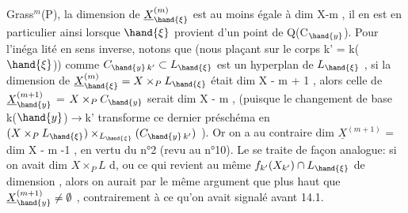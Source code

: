 
Grass$^{m}$(P), la dimension de $\underline{X}^{(m)}_{\hand{\xi}}$ est au moins égale à dim X-m , il en est
en particulier ainsi lorsque $\hand{\xi}$ provient d'un point de Q(C$_{\hand{y}}$). Pour l'inéga
lité en sens inverse, notons que (nous plaçant sur le corps k' = k($\hand{\xi}$))
comme $C_{\hand{y}\,k'} \subset L_{\hand{\xi}}$ est  un hyperplan de $L_{\hand{\xi}}$ , si la dimension de
$\underline{X}^{(m)}_{\hand{\xi}} = X\times_{P}L_{\hand{\xi}}$ était  dim X - m + 1 , alors celle de $\underline{X}^{(m+1)}_{\hand{y}}$ =
$X\times_{P}C_{\hand{y}}$ serait  dim X - m , (puisque le changement de base k($\hand{y}$)$\to$k'
transforme ce dernier préschéma en $(X\times_{P}L_{\hand{\xi}})\times_{L_{\hand{\xi}}}(C_{\hand{y}\,k'})$ ). Or on a au
contraire  dim $\underline{X}^{(m+1)}$ = dim X - m -1 
, en vertu du n°2 (revu au n°10).
Le   se traite
de façon analogue: si on avait dim $X\times_{P}L$ \hand{$\geqslant$} d,  ou
ce qui revient au même  $f_{k'}(X_{k'}) \cap L_{\hand{\xi}}$ de dimension \hand{$\geqslant$},
alors on aurait par le même argument que plus  haut que
$\underline{X}^{(m+1)}_{\hand{y}} \neq \emptyset$ , contrairement à ce qu'on avait signalé avant 14.1.

